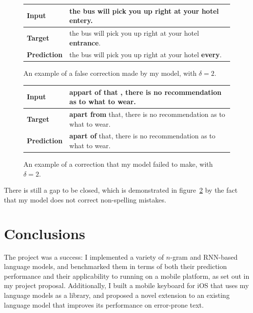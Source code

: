 \documentclass[a4paper, 12pt]{report}
\newcommand{\tbf}[1]{\textbf{#1}}
\begin{document}
\begin{figure}[h]
\captionsetup{justification=centering}
\begin{adjustbox}{center}
\begin{tabular}{L{2.5cm} | L{12cm}}
	\tbf{Input} & the bus will pick you up right at your hotel \tbf{entery}. \\ \hline
	\tbf{Target} & the bus will pick you up right at your hotel \tbf{entrance}. \\ \hline
	\tbf{Prediction} & the bus will pick you up right at your hotel \tbf{every}. \\
\end{tabular}
\end{adjustbox}
\caption{An example of a false correction made by my model, with $\delta = 2$.}
\label{fig:error_correcting_false}
\end{figure}

\begin{figure}[h]
\captionsetup{justification=centering}
\begin{adjustbox}{center}
\begin{tabular}{L{2.5cm} | L{12cm}}
	\tbf{Input} & \tbf{appart of} that , there is no recommendation as to what to wear. \\ \hline
	\tbf{Target} & \tbf{apart from} that, there is no recommendation as to what to wear. \\ \hline
	\tbf{Prediction} & \tbf{apart of} that, there is no recommendation as to what to wear. \\
\end{tabular}
\end{adjustbox}
\caption{An example of a correction that my model failed to make, with $\delta = 2$.}
\label{fig:error_correcting_bad}
\end{figure}

There is still a gap to be closed, which is demonstrated in figure~\ref{fig:error_correcting_bad} by the fact that my model does not correct non-spelling mistakes.

\chapter{Conclusions}

The project was a success: I implemented a variety of $n$-gram and RNN-based language models, and benchmarked them in terms of both their prediction performance and their applicability to running on a mobile platform, as set out in my project proposal. Additionally, I built a mobile keyboard for iOS that uses my language models as a library, and proposed a novel extension to an existing language model that improves its performance on error-prone text. \\
\end{document}

